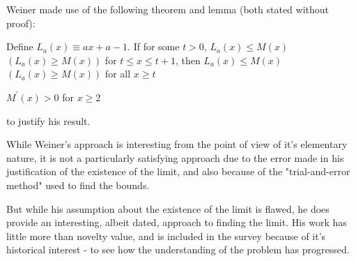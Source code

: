 Weiner made use of the following theorem and lemma (both stated without proof): \bigskip

\begin{mdframed}
	\begin{theorem}
		Define $L_{a}(x) \equiv ax + a - 1$. If for some $t > 0$, $L_{a}(x) \leq M(x)$ $(L_{a}(x) \geq M(x))$ 
		for $t \leq x \leq t + 1$, then $L_{a}(x) \leq M(x)$ $(L_{a}(x) \geq M(x))$ for all $x \geq t$ \bigskip
	\end{theorem} 
	\begin{lemma}
		$M^{\prime}(x) > 0$ for $x \geq 2$ \bigskip
	\end{lemma}
\end{mdframed} \bigskip

to justify his result. \bigskip

While Weiner's approach is interesting from the point of view of it's elementary nature, it is not a 
particularly satisfying approach due to the error made in his justification of the existence of the 
limit, and also because of the "trial-and-error method" used to find the bounds. \bigskip

But while his assumption about the existence of the limit is flawed, he does provide an interesting, 
albeit dated, approach to finding the limit. His work has little more than novelty value, and is 
included in the survey because of it's historical interest - to see how the understanding of the 
problem has progressed. \bigskip











